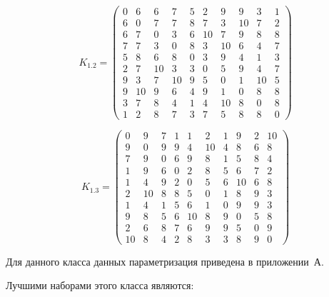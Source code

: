 \begin{equation}
	\label{eq:kd1.2}
	K_{1.2} = \begin{pmatrix}
		0 & 6 & 6 & 7 & 5 & 2 & 9 & 9 & 3 & 1 \\ 
		6 & 0 & 7 & 7 & 8 & 7 & 3 & 10 & 7 & 2 \\ 
		6 & 7 & 0 & 3 & 6 & 10 & 7 & 9 & 8 & 8 \\ 
		7 & 7 & 3 & 0 & 8 & 3 & 10 & 6 & 4 & 7 \\ 
		5 & 8 & 6 & 8 & 0 & 3 & 9 & 4 & 1 & 3 \\ 
		2 & 7 & 10 & 3 & 3 & 0 & 5 & 9 & 4 & 7 \\ 
		9 & 3 & 7 & 10 & 9 & 5 & 0 & 1 & 10 & 5 \\ 
		9 & 10 & 9 & 6 & 4 & 9 & 1 & 0 & 8 & 8 \\ 
		3 & 7 & 8 & 4 & 1 & 4 & 10 & 8 & 0 & 8 \\ 
		1 & 2 & 8 & 7 & 3 & 7 & 5 & 8 & 8 & 0  
	\end{pmatrix}
\end{equation}

\begin{equation}
	\label{eq:kd1.3}
	K_{1.3} = \begin{pmatrix}
		0 & 9 & 7 & 1 & 1 & 2 & 1 & 9 & 2 & 10 \\ 
		9 & 0 & 9 & 9 & 4 & 10 & 4 & 8 & 6 & 8 \\ 
		7 & 9 & 0 & 6 & 9 & 8 & 1 & 5 & 8 & 4 \\ 
		1 & 9 & 6 & 0 & 2 & 8 & 5 & 6 & 7 & 2 \\ 
		1 & 4 & 9 & 2 & 0 & 5 & 6 & 10 & 6 & 8 \\ 
		2 & 10 & 8 & 8 & 5 & 0 & 1 & 8 & 9 & 3 \\ 
		1 & 4 & 1 & 5 & 6 & 1 & 0 & 9 & 9 & 3 \\ 
		9 & 8 & 5 & 6 & 10 & 8 & 9 & 0 & 5 & 8 \\ 
		2 & 6 & 8 & 7 & 6 & 9 & 9 & 5 & 0 & 9 \\ 
		10 & 8 & 4 & 2 & 8 & 3 & 3 & 8 & 9 & 0
	\end{pmatrix}
\end{equation}

Для данного класса данных параметризация приведена в приложении~А.

Лучшими наборами этого класса являются:

